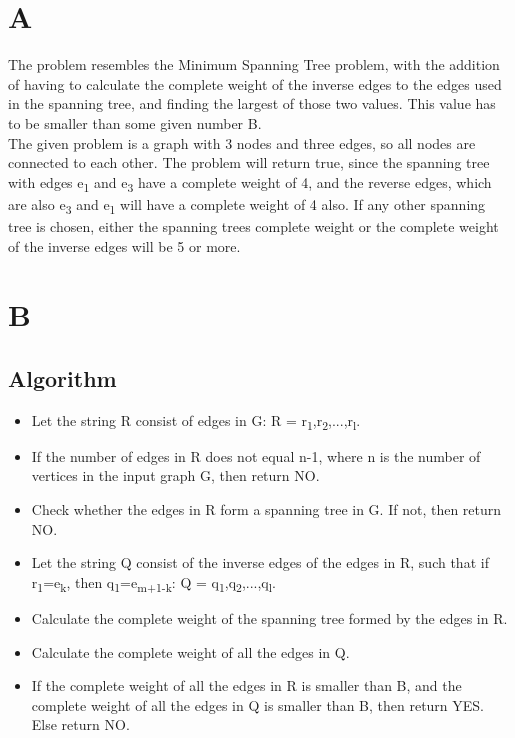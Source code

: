 \documentclass[11pt,a4paper]{article}
\author{Casper Tollund - s093037}
\begin{document}
\section{A}

The problem resembles the Minimum Spanning Tree problem, with the addition of having to calculate the complete weight of the inverse edges to the edges used in the spanning tree, and finding the largest of those two values. This value has to be smaller than some given number B. \\
	
	The given problem is a graph with 3 nodes and three edges, so all nodes are connected to each other. The problem will return true, since the spanning tree with edges e\textsubscript{1} and e\textsubscript{3} have a complete weight of 4, and the reverse edges, which are also e\textsubscript{3} and e\textsubscript{1} will have a complete weight of 4 also. If any other spanning tree is chosen, either the spanning trees complete weight or the complete weight of the inverse edges will be 5 or more. 	\\

\section{B}

\subsection{Algorithm}
\begin{itemize}
\item Let the string R consist of edges in G: R = r\textsubscript{1},r\textsubscript{2},...,r\textsubscript{l}.
\item If the number of edges in R does not equal n-1, where n is the number of vertices in the input graph G, then return NO.
\item Check whether the edges in R form a spanning tree in G. If not, then return NO.
\item Let the string Q consist of the inverse edges of the edges in R, such that if r\textsubscript{1}=e\textsubscript{k}, then q\textsubscript{1}=e\textsubscript{m+1-k}: Q = q\textsubscript{1},q\textsubscript{2},...,q\textsubscript{l}. 
\item Calculate the complete weight of the spanning tree formed by the edges in R.
\item Calculate the complete weight of all the edges in Q.
\item If the complete weight of all the edges in R is smaller than B, and the complete weight of all the edges in Q is smaller than B, then return YES. Else return NO.\\
\end{itemize}
\end{document}
